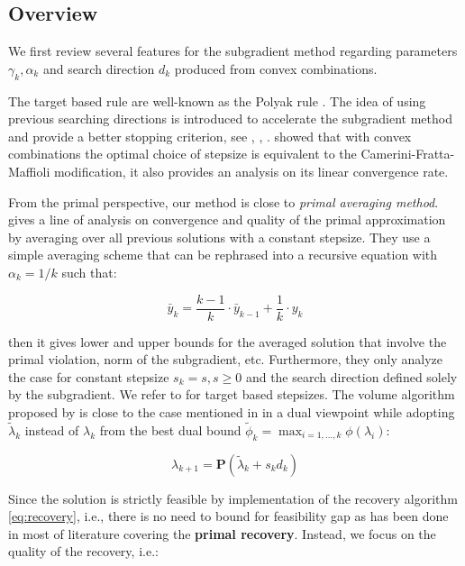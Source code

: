 \documentclass[../main]{subfiles}
\begin{document}
\subsection{Overview}\label{sec:dual.overview}


We first review several features for the subgradient method regarding
parameters \(\gamma_k, \alpha_k\) and search direction \(d_k\) produced from convex combinations.

The target based rule are well-known as the Polyak rule \cite{polyak_general_1967}.
The idea of using previous searching directions is introduced to accelerate the subgradient method and provide a better stopping criterion,
see \cite{camerini_improving_1975}, \cite{brannlund_generalized_1995}, \cite{barahona_volume_2000}.
\cite{brannlund_generalized_1995} showed that with convex combinations the optimal choice of stepsize is
equivalent to the Camerini-Fratta-Maffioli modification, it also provides an analysis on its linear convergence rate.

From the primal perspective, our method is close to \emph{primal
  averaging method}. \cite{nedic_approximate_2009}
gives a line of analysis on convergence and quality of the primal
approximation by averaging over all previous solutions with a constant
stepsize. They use a simple averaging scheme that can be rephrased into a
recursive equation with \(\alpha_k = 1/k\) such that:

\[\bar y_k = \frac{k-1}{k}\cdot\bar y_{k-1} + \frac{1}{k} \cdot y_k\]

then it gives lower and upper bounds for the averaged solution
that involve the primal violation, norm of the subgradient, etc. Furthermore, they only analyze the case for constant
stepsize \(s_k = s, s\ge 0\) and the search direction defined solely by
the subgradient. We refer to \cite{kiwiel_lagrangian_2007} for target based
stepsizes. The volume algorithm proposed by \cite{barahona_volume_2000} is close to the
case mentioned in \cite{brannlund_generalized_1995} in a dual
viewpoint while adopting \(\tilde \lambda_{k}\) instead of \(\lambda_k\) from the best dual bound
\(\tilde \phi_k = \max_{i=1, ..., k} \phi(\lambda_i)\):

\[\lambda_{k+1} = \mathbf{P}(\tilde\lambda_{k} + s_{k}d_{k})\]

Since the solution is strictly feasible by implementation of the
recovery algorithm \eqref{eq:recovery}, i.e., there is no need to bound for feasibility gap
as has been done in most of literature covering the \textbf{primal
  recovery}. Instead, we focus on the quality of the recovery, i.e.:
\end{document}
